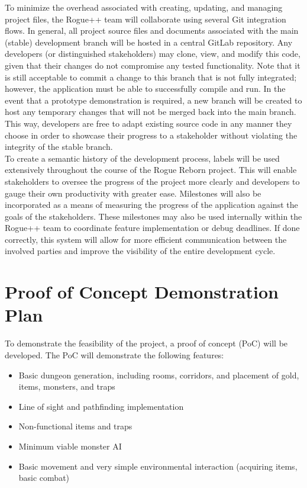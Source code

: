 \documentclass{article}
\begin{document}
\indent
To minimize the overhead associated with creating, updating, and managing project files, the Rogue++ team will collaborate using several Git integration flows.  In general, all project source files and documents associated with the main (stable) development branch will be hosted in a central GitLab repository.  Any developers (or distinguished stakeholders) may clone, view, and modify this code, given that their changes do not compromise any tested functionality.  Note that it is still acceptable to commit a change to this branch that is not fully integrated; however, the application must be able to successfully compile and run.  In the event that a prototype demonstration is required, a new branch will be created to host any temporary changes that will not be merged back into the main branch.  This way, developers are free to adapt existing source code in any manner they choose in order to showcase their progress to a stakeholder without violating the integrity of the stable branch.\\

To create a semantic history of the development process, labels will be used extensively throughout the course of the Rogue Reborn project.  This will enable stakeholders to oversee the progress of the project more clearly and developers to gauge their own productivity with greater ease.  Milestones will also be incorporated as a means of measuring the progress of the application against the goals of the stakeholders.  These milestones may also be used internally within the Rogue++ team to coordinate feature implementation or debug deadlines. If done correctly, this system will allow for more efficient communication between the involved parties and improve the visibility of the entire development cycle.

\section{Proof of Concept Demonstration Plan}

\indent
To demonstrate the feasibility of the project, a proof of concept (PoC) will be developed. The PoC will demonstrate the following features:

\begin{itemize}
	\item Basic dungeon generation, including rooms, corridors, and placement of gold, items, monsters, and traps
	\item Line of sight and pathfinding implementation
	\item Non-functional items and traps
	\item Minimum viable monster AI
	\item Basic movement and very simple environmental interaction (acquiring items, basic combat)
\end{itemize}
\end{document}
